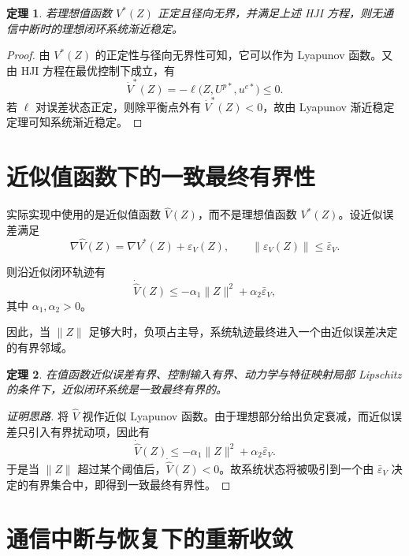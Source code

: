 ﻿\documentclass[12pt,a4paper]{ctexart}
\newtheorem{theorem}{定理}
\begin{document}
\begin{theorem}
若理想值函数 $V^*(Z)$ 正定且径向无界，并满足上述 HJI 方程，则无通信中断时的理想闭环系统渐近稳定。
\end{theorem}

\begin{proof}
由 $V^*(Z)$ 的正定性与径向无界性可知，它可以作为 Lyapunov 函数。又由 HJI 方程在最优控制下成立，有
\[
\dot V^*(Z)=-\ell\big(Z,U^{p*},u^{e*}\big)\le 0.
\]
若 $\ell$ 对误差状态正定，则除平衡点外有 $\dot V^*(Z)<0$，故由 Lyapunov 渐近稳定定理可知系统渐近稳定。
\end{proof}

\section{近似值函数下的一致最终有界性}

实际实现中使用的是近似值函数 $\hat V(Z)$，而不是理想值函数 $V^*(Z)$。设近似误差满足
\begin{equation}
    \nabla \hat V(Z)=\nabla V^*(Z)+\varepsilon_V(Z),
    \qquad \|\varepsilon_V(Z)\|\le \bar\varepsilon_V.
\end{equation}

则沿近似闭环轨迹有
\begin{equation}
    \dot{\hat V}(Z)
    \le
    -\alpha_1\|Z\|^2 + \alpha_2\bar\varepsilon_V,
\end{equation}
其中 $\alpha_1,\alpha_2>0$。

因此，当 $\|Z\|$ 足够大时，负项占主导，系统轨迹最终进入一个由近似误差决定的有界邻域。

\begin{theorem}
在值函数近似误差有界、控制输入有界、动力学与特征映射局部 Lipschitz 的条件下，近似闭环系统是一致最终有界的。
\end{theorem}

\begin{proof}[证明思路]
将 $\hat V$ 视作近似 Lyapunov 函数。由于理想部分给出负定衰减，而近似误差只引入有界扰动项，因此有
\[
\dot{\hat V}(Z)\le -\alpha_1\|Z\|^2+\alpha_2\bar\varepsilon_V.
\]
于是当 $\|Z\|$ 超过某个阈值后，$\dot{\hat V}(Z)<0$。故系统状态将被吸引到一个由 $\bar\varepsilon_V$ 决定的有界集合中，即得到一致最终有界性。
\end{proof}

\section{通信中断与恢复下的重新收敛}
\end{document}
